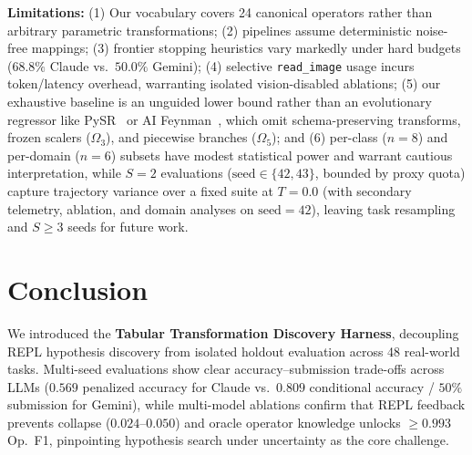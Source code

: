 \documentclass[sigconf]{acmart}
\begin{document}
\noindent\textbf{Limitations:} (1) Our vocabulary covers 24 canonical operators rather than arbitrary parametric transformations; (2) pipelines assume deterministic noise-free mappings; (3) frontier stopping heuristics vary markedly under hard budgets ($68.8\%$ Claude vs.\ $50.0\%$ Gemini); (4) selective \texttt{read\_image} usage incurs token/latency overhead, warranting isolated vision-disabled ablations; (5) our exhaustive baseline is an unguided lower bound rather than an evolutionary regressor like PySR~\cite{cranmer2023pysr} or AI Feynman~\cite{udrescu2020ai}, which omit schema-preserving transforms, frozen scalers ($\Omega_3$), and piecewise branches ($\Omega_5$); and (6) per-class ($n=8$) and per-domain ($n=6$) subsets have modest statistical power and warrant cautious interpretation, while $S=2$ evaluations ($\text{seed}\in\{42,43\}$, bounded by proxy quota) capture trajectory variance over a fixed suite at $T=0.0$ (with secondary telemetry, ablation, and domain analyses on $\text{seed}=42$), leaving task resampling and $S\ge 3$ seeds for future work.

\section{Conclusion}
We introduced the \textbf{Tabular Transformation Discovery Harness}, decoupling REPL hypothesis discovery from isolated holdout evaluation across 48 real-world tasks. Multi-seed evaluations show clear accuracy--submission trade-offs across LLMs ($0.569$ penalized accuracy for Claude vs.\ $0.809$ conditional accuracy / $50\%$ submission for Gemini), while multi-model ablations confirm that REPL feedback prevents collapse ($0.024$--$0.050$) and oracle operator knowledge unlocks $\ge 0.993$ Op.\ F1, pinpointing hypothesis search under uncertainty as the core challenge.



\end{document}
